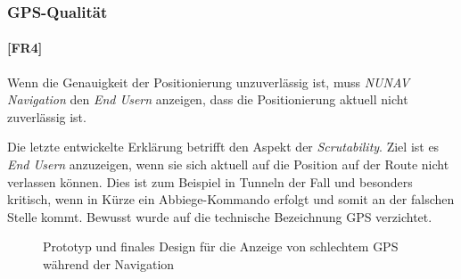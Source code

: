 \subsubsection{GPS-Qualität}
\label{sec:gps_accuracy_definition}

\paragraph{[FR4]} Wenn die Genauigkeit der Positionierung unzuverlässig ist, muss \textit{NUNAV Navigation} den \textit{End Usern} anzeigen, dass die Positionierung aktuell nicht zuverlässig ist.

Die letzte entwickelte Erklärung betrifft den Aspekt der \textit{Scrutability}. Ziel ist es \textit{End Usern} anzuzeigen, wenn sie sich aktuell auf die Position auf der Route nicht verlassen können. Dies ist zum Beispiel in Tunneln der Fall und besonders kritisch, wenn in Kürze ein Abbiege-Kommando erfolgt und somit an der falschen Stelle kommt. Bewusst wurde auf die technische Bezeichnung \glqq GPS\grqq{} verzichtet.

\begin{figure}[htb!]
    \centering
    \hspace{.055\linewidth}
    \caption{Prototyp und finales Design für die Anzeige von schlechtem GPS während der Navigation}
    \label{fig:prototype_position_accuracy}
\end{figure}

